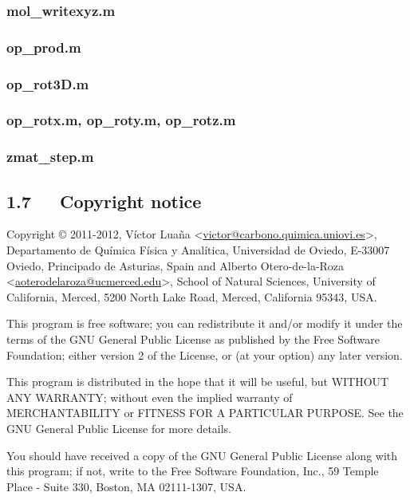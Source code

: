 \documentclass[a4paper]{article}
\begin{document}
\subsubsection{mol\_writexyz.m%
  \label{mol-writexyz-m}%
}


\subsubsection{op\_prod.m%
  \label{op-prod-m}%
}


\subsubsection{op\_rot3D.m%
  \label{op-rot3d-m}%
}


\subsubsection{op\_rotx.m, op\_roty.m, op\_rotz.m%
  \label{op-rotx-m-op-roty-m-op-rotz-m}%
}


\subsubsection{zmat\_step.m%
  \label{zmat-step-m}%
}


\subsection{1.7~~~Copyright notice%
  \label{copyright-notice}%
}

Copyright © 2011-2012, Víctor Luaña <\href{mailto:victor@carbono.quimica.uniovi.es}{victor@carbono.quimica.uniovi.es}>,
Departamento de Química Física y Analítica, Universidad de Oviedo,
E-33007 Oviedo, Principado de Asturias, Spain
and Alberto Otero-de-la-Roza <\href{mailto:aoterodelaroza@gmail.com}{aoterodelaroza@ucmerced.edu}>, School of
Natural Sciences, University of California, Merced, 5200 North Lake Road,
Merced, California 95343, USA.

This program is free software; you can redistribute it and/or
modify it under the terms of the GNU General Public License
as published by the Free Software Foundation; either version 2
of the License, or (at your option) any later version.

This program is distributed in the hope that it will be useful,
but WITHOUT ANY WARRANTY; without even the implied warranty of
MERCHANTABILITY or FITNESS FOR A PARTICULAR PURPOSE.  See the
GNU General Public License for more details.

You should have received a copy of the GNU General Public License
along with this program; if not, write to the Free Software
Foundation, Inc., 59 Temple Place - Suite 330, Boston,
MA 02111-1307, USA.

\begin{thebibliography}{mw1}
\end{thebibliography}
\end{document}

